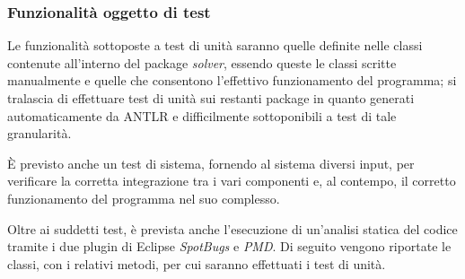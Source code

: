 \documentclass[12pt]{article}
\newcounter{subsubsubsection}[subsubsection]
\begin{document}
\subsubsection{Funzionalità oggetto di test}
Le funzionalità sottoposte a test di unità saranno quelle definite nelle classi contenute all'interno del package \textit{solver}, essendo queste le classi scritte manualmente e quelle che consentono l'effettivo funzionamento del programma; si tralascia di effettuare test di unità sui restanti package in quanto generati automaticamente da ANTLR e difficilmente sottoponibili a test di tale granularità. \par
È previsto anche un test di sistema, fornendo al sistema diversi input, per verificare la corretta integrazione tra i vari componenti e, al contempo, il corretto funzionamento del programma nel suo complesso. \par
Oltre ai suddetti test, è prevista anche l'esecuzione di un'analisi statica del codice tramite i due plugin di Eclipse \textit{SpotBugs} e \textit{PMD}.
Di seguito vengono riportate le classi, con i relativi metodi, per cui saranno effettuati i test di unità.
\end{document}
